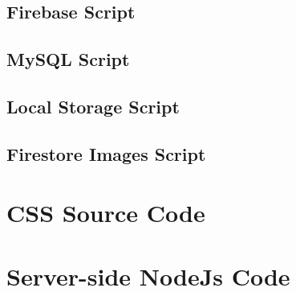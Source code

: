 \documentclass[letterpaper]{article}
\begin{document}
\subsection{Firebase Script}

\newpage
\subsection{MySQL Script}

\newpage
\subsection{Local Storage Script}

\newpage
\subsection{Firestore Images Script}

\newpage

\section{CSS Source Code}

\newpage

\section{Server-side NodeJs Code}

\end{document}
